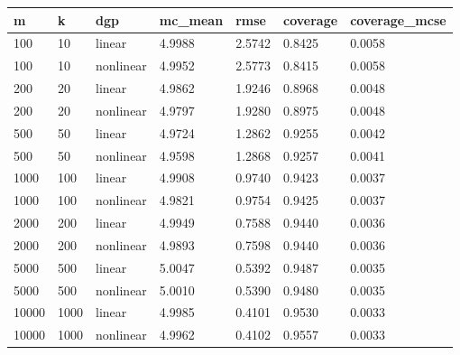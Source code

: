 \begin{tabular}{lllllll}
\hline
m & k & dgp & mc\_mean & rmse & coverage & coverage\_mcse \\
\hline
100 & 10 & linear & 4.9988 & 2.5742 & 0.8425 & 0.0058 \\
100 & 10 & nonlinear & 4.9952 & 2.5773 & 0.8415 & 0.0058 \\
200 & 20 & linear & 4.9862 & 1.9246 & 0.8968 & 0.0048 \\
200 & 20 & nonlinear & 4.9797 & 1.9280 & 0.8975 & 0.0048 \\
500 & 50 & linear & 4.9724 & 1.2862 & 0.9255 & 0.0042 \\
500 & 50 & nonlinear & 4.9598 & 1.2868 & 0.9257 & 0.0041 \\
1000 & 100 & linear & 4.9908 & 0.9740 & 0.9423 & 0.0037 \\
1000 & 100 & nonlinear & 4.9821 & 0.9754 & 0.9425 & 0.0037 \\
2000 & 200 & linear & 4.9949 & 0.7588 & 0.9440 & 0.0036 \\
2000 & 200 & nonlinear & 4.9893 & 0.7598 & 0.9440 & 0.0036 \\
5000 & 500 & linear & 5.0047 & 0.5392 & 0.9487 & 0.0035 \\
5000 & 500 & nonlinear & 5.0010 & 0.5390 & 0.9480 & 0.0035 \\
10000 & 1000 & linear & 4.9985 & 0.4101 & 0.9530 & 0.0033 \\
10000 & 1000 & nonlinear & 4.9962 & 0.4102 & 0.9557 & 0.0033 \\
\hline
\end{tabular}
